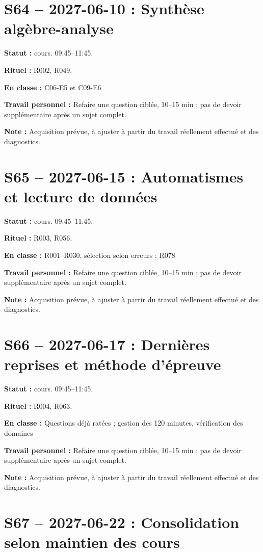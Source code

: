 \section*{S64 -- 2027-06-10 : Synthèse algèbre-analyse}
\textbf{Statut :} cours. 09:45–11:45.\par\textbf{Rituel :} R002, R049.\par\textbf{En classe :} C06-E5 et C09-E6\par\textbf{Travail personnel :} Refaire une question ciblée, 10–15 min ; pas de devoir supplémentaire après un sujet complet.\par\textbf{Note :} Acquisition prévue, à ajuster à partir du travail réellement effectué et des diagnostics.
\section*{S65 -- 2027-06-15 : Automatismes et lecture de données}
\textbf{Statut :} cours. 09:45–11:45.\par\textbf{Rituel :} R003, R056.\par\textbf{En classe :} R001–R030, sélection selon erreurs ; R078\par\textbf{Travail personnel :} Refaire une question ciblée, 10–15 min ; pas de devoir supplémentaire après un sujet complet.\par\textbf{Note :} Acquisition prévue, à ajuster à partir du travail réellement effectué et des diagnostics.
\section*{S66 -- 2027-06-17 : Dernières reprises et méthode d’épreuve}
\textbf{Statut :} cours. 09:45–11:45.\par\textbf{Rituel :} R004, R063.\par\textbf{En classe :} Questions déjà ratées ; gestion des 120 minutes, vérification des domaines\par\textbf{Travail personnel :} Refaire une question ciblée, 10–15 min ; pas de devoir supplémentaire après un sujet complet.\par\textbf{Note :} Acquisition prévue, à ajuster à partir du travail réellement effectué et des diagnostics.
\section*{S67 -- 2027-06-22 : Consolidation selon maintien des cours}
